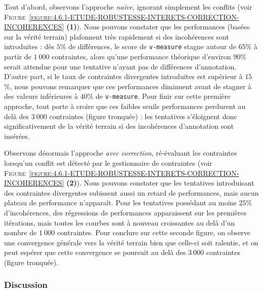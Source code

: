 			Tout d'abord, observons l'approche \textit{naïve}, ignorant simplement les conflits (voir \textsc{Figure~\ref{figure:4.6.1-ETUDE-ROBUSTESSE-INTERETS-CORRECTION-INCOHERENCES}} \textbf{(1)}).
			Nous pouvons constater que les performances (basées sur la vérité terrain) plafonnent très rapidement si des incohérences sont introduites : dès $5$\% de différences, le score de \texttt{v-measure} stagne autour de $65$\% à partir de $1~000$ contraintes, alors qu'une performance théorique d'environ $90$\% serait attendue pour une tentative n'ayant pas de différences d'annotation.
			D'autre part, si le taux de contraintes divergentes introduites est supérieur à $15$\%, nous pouvons remarquer que ces performances diminuent avant de stagner à des valeurs inférieures à $40$\% de \texttt{v-measure}.
			Pour finir sur cette première approche, tout porte à croire que ces faibles seuils performances perdurent au delà des $3~000$ contraintes (figure tronquée) : les tentatives s'éloignent donc significativement de la vérité terrain si des incohérences d'annotation sont insérées.
			
			
			Observons désormais l'approche \textit{avec correction}, ré-évaluant les contraintes lorsqu'un conflit est détecté par le gestionnaire de contraintes (voir \textsc{Figure~\ref{figure:4.6.1-ETUDE-ROBUSTESSE-INTERETS-CORRECTION-INCOHERENCES}} \textbf{(2)}).
			Nous pouvons constater que les tentatives introduisant des contraintes divergentes subissent aussi un retard de performances, mais aucun plateau de performance n'apparaît.
			Pour les tentatives possédant au moins $25$\% d'incohérences, des régressions de performances apparaissent sur les premières itérations, mais toutes les courbes sont à nouveau croissantes au delà d'un nombre de $1~000$ contraintes.
			Pour conclure sur cette seconde figure, on observe une convergence générale vers la vérité terrain bien que celle-ci soit ralentie, et on peut espérer que cette convergence se poursuit au delà des $3~000$ contraintes (figure tronquée).

		\subsubsection{Discussion}
		
		
			
